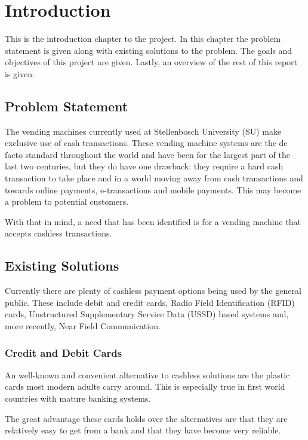 \chapter{Introduction}

This is the introduction chapter to the project. In this chapter the problem statement is
given along with existing solutions to the problem. The goals and objectives of this project
are given. Lastly, an overview of the rest of this report is given. 

\section{Problem Statement}

The vending machines currently used at Stellenbosch University (SU) make exclusive use of
cash transactions. These vending machine systems are the de facto standard throughout the
world and have been for the largest part of the last two centuries, but they do have one
drawback: they require a hard cash transaction to take place and in a world moving away from
cash transactions and towards online payments, e-transactions and mobile payments. This may
become a problem to potential customers.

With that in mind, a need that has been identified is for a vending machine that accepts
cashless transactions.

\section{Existing Solutions}

Currently there are plenty of cashless payment options being used by the general public. These
include debit and credit cards, Radio Field Identification (RFID) cards,
Unstructured Supplementary Service Data (USSD) based systems and, more recently, Near Field Communication.

\subsection{Credit and Debit Cards}

An well-known and convenient alternative to cashless solutions are the plastic cards most
modern adults carry around. This is especially true in first world countries with mature
banking systems. 

The great advantage these cards holds over the alternatives are that they are
relatively easy to get from a bank and that they have become very reliable. 

